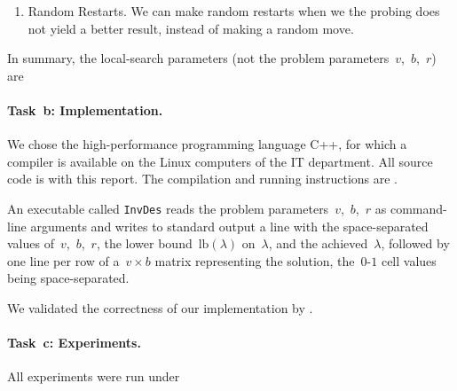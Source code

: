 \begin{enumerate}
\item Random Restarts. We can make random restarts when we the probing does not yield a better result, instead of making a random move. 
\end{enumerate}
In summary, the local-search parameters (not the problem
parameters~$v$,~$b$,~$r$) are~

\paragraph{Task~b: Implementation.}
We chose the high-performance programming language C++, for
which a compiler is available on the Linux
computers of the IT department.  All source code is 
with this report.  The compilation and running instructions are
\todo{\filler}.

An executable called \texttt{InvDes} reads the problem
parameters~$v$,~$b$,~$r$ as command-line arguments and writes to
standard output a line with the space-separated values
of~$v$,~$b$,~$r$, the lower bound~$\text{lb}(\lambda)$ on~$\lambda$,
and the achieved~$\lambda$, followed by one line per row of
a~$v \times b$ matrix representing the solution, the~$0$-$1$ cell
values being space-separated.

We validated the correctness of our implementation by .

\paragraph{Task~c: Experiments.}
All experiments were run under

